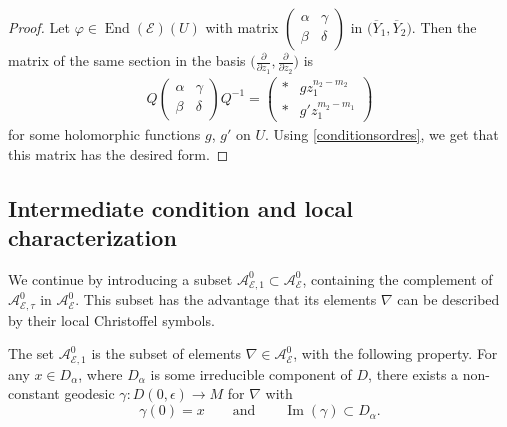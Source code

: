 \documentclass[10pt,a4paper]{amsart}
\newcommand{\der}[2]{\frac{\partial #1}{\partial#2}}
\numberwithin{equation}{section}
\begin{document}
\begin{proof}
 Let $\varphi \in \operatorname{End}(\mathcal{E})(U)$ with matrix $\left(\begin{smallmatrix} \alpha & \gamma \\ \beta & \delta \end{smallmatrix}\right)$ in $\big(\overline{Y}_1,\overline{Y}_2\big)$. Then the matrix of the same section in the basis $\big(\der{}{z_1},\der{}{z_2}\big)$ is
 \begin{gather*} Q \begin{pmatrix} \alpha & \gamma \\ \beta & \delta \end{pmatrix} Q^{-1} = \begin{pmatrix} * & g z_1^{n_2-m_2}\\ * & g' z_1^{m_2-m_1} \end{pmatrix} \end{gather*}
 for some holomorphic functions $g$, $g'$ on $U$. Using \eqref{conditionsordres}, we get that this matrix has the desired form.
\end{proof}

\subsection{Intermediate condition and local characterization}
We continue by introducing a subset $\mathcal{A}^0_{\mathcal{E},1}\subset \mathcal{A}_\mathcal{E}^0$, containing the complement of $\mathcal{A}^0_{\mathcal{E},\tau}$ in $\mathcal{A}^0_{\mathcal{E}}$. This subset has the advantage that its elements $\nabla$ can be described by their local Christoffel symbols.

\begin{Definition}\label{intermediate} The set $\mathcal{A}^0_{\mathcal{E},1}$ is the subset of elements $\nabla \in \mathcal{A}^0_\mathcal{E}$, with the following property. For any $x\in D_\alpha$, where $D_\alpha$ is some irreducible component of $D$, there exists a non-constant geodesic $\gamma\colon D(0,\epsilon) \longrightarrow M$ for $\nabla$ with
\[ \gamma(0)=x \qquad \text{and} \qquad \operatorname{Im}(\gamma) \subset D_\alpha.\]
\end{Definition}
\end{document}
